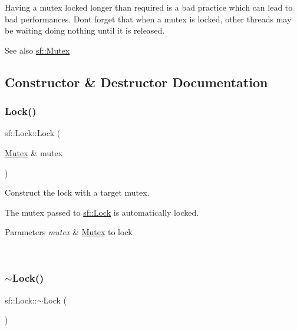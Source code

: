 Having a mutex locked longer than required is a bad practice which can lead to bad performances. Don\textquotesingle{}t forget that when a mutex is locked, other threads may be waiting doing nothing until it is released.

\begin{DoxySeeAlso}{See also}
\mbox{\hyperlink{classsf_1_1_mutex}{sf\+::\+Mutex}} \begin{DoxyVerb}\end{DoxyVerb}
 
\end{DoxySeeAlso}


\subsection{Constructor \& Destructor Documentation}
\mbox{\label{classsf_1_1_lock_a1a4c5d7a15da61103d85c9aa7f118920}} 
\subsubsection{\texorpdfstring{Lock()}{Lock()}}
{\footnotesize\ttfamily sf\+::\+Lock\+::\+Lock (\begin{DoxyParamCaption}\item[{\mbox{\hyperlink{classsf_1_1_mutex}{Mutex}} \&}]{mutex }\end{DoxyParamCaption})\hspace{0.3cm}{\ttfamily [explicit]}}



Construct the lock with a target mutex. 

The mutex passed to \mbox{\hyperlink{classsf_1_1_lock}{sf\+::\+Lock}} is automatically locked.


\begin{DoxyParams}{Parameters}
{\em mutex} & \mbox{\hyperlink{classsf_1_1_mutex}{Mutex}} to lock \begin{DoxyVerb}\end{DoxyVerb}
 \\
\hline
\end{DoxyParams}
\mbox{\label{classsf_1_1_lock_a8168b36323a18ccf5b6bc531d964aec5}} 
\subsubsection{\texorpdfstring{$\sim$Lock()}{~Lock()}}
{\footnotesize\ttfamily sf\+::\+Lock\+::$\sim$\+Lock (\begin{DoxyParamCaption}{ }\end{DoxyParamCaption})}



